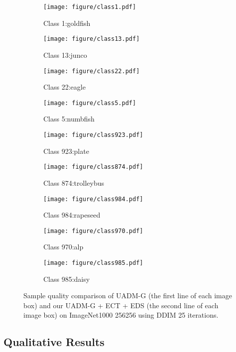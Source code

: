\documentclass[runningheads]{llncs}
\begin{document}
 \begin{figure}[!t]
     \centering
     \begin{subfigure}[b]{0.32\textwidth}
         \centering
         \texttt{[image: figure/class1.pdf]}
         \caption{Class 1:goldfish}
         \label{fig:compare_0}
     \end{subfigure}
     \hfill
     \begin{subfigure}[b]{0.32\textwidth}
         \centering
         \texttt{[image: figure/class13.pdf]}
         \caption{Class 13:junco}
         \label{fig:compare_1}
     \end{subfigure}
     \hfill
     \begin{subfigure}[b]{0.32\textwidth}
         \centering
         \texttt{[image: figure/class22.pdf]}
         \caption{Class 22:eagle}
         \label{fig:compare_2}
     \end{subfigure}
     \hfill
     \begin{subfigure}[b]{0.32\textwidth}
         \centering
         \texttt{[image: figure/class5.pdf]}
         \caption{Class 5:numbfish}
         \label{fig:compare_3}
     \end{subfigure}
     \hfill
     \begin{subfigure}[b]{0.32\textwidth}
         \centering
         \texttt{[image: figure/class923.pdf]}
\caption{Class 923:plate}
     \end{subfigure}
     \hfill
     \begin{subfigure}[b]{0.32\textwidth}
         \centering
         \texttt{[image: figure/class874.pdf]}
         \caption{Class 874:trolleybus}
         \label{fig:compare_5}
     \end{subfigure}
    \begin{subfigure}[b]{0.32\textwidth}
         \centering
         \texttt{[image: figure/class984.pdf]}
         \caption{Class 984:rapeseed}
         \label{fig:compare_6}
     \end{subfigure}
     \hfill
     \begin{subfigure}[b]{0.32\textwidth}
         \centering
         \texttt{[image: figure/class970.pdf]}
         \caption{Class 970:alp}
         \label{fig:compare_7}
     \end{subfigure}
     \hfill
     \begin{subfigure}[b]{0.32\textwidth}
         \centering
         \texttt{[image: figure/class985.pdf]}
         \caption{Class 985:daisy}
         \label{fig:compare_8}
     \end{subfigure}
    \caption{
Sample quality comparison of UADM-G \cite{dhariwal2021diffusion} (the first line of each image box) and our UADM-G + ECT + EDS (the second line of each image box) on ImageNet1000 256256 using DDIM 25 iterations. 
    }
    \label{fig:comparation_results}
    \vskip -0.2in
\end{figure} \subsection{Qualitative Results}
\end{document}
